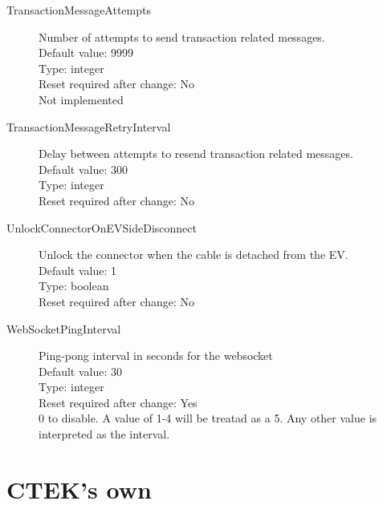 \begin{description}
\item[TransactionMessageAttempts] Number of attempts to send transaction related messages.\\
  Default value: 9999\\
  Type: integer\\
  Reset required after change: No\\
  Not implemented\\

\item[TransactionMessageRetryInterval] Delay between attempts to resend transaction related messages.\\
  Default value: 300\\
  Type: integer\\
  Reset required after change: No\\

\item[UnlockConnectorOnEVSideDisconnect] Unlock the connector when the cable is detached from the EV.\\
  Default value: 1\\
  Type: boolean\\
  Reset required after change: No\\

\item[WebSocketPingInterval] Ping-pong interval in seconds for the websocket\\
  Default value: 30\\
  Type: integer\\
  Reset required after change: Yes\\
  0 to disable. A value of 1-4 will be treatad as a 5. Any other value is interpreted as the interval. \\

\end{description}
\pagebreak\section{CTEK's own}

